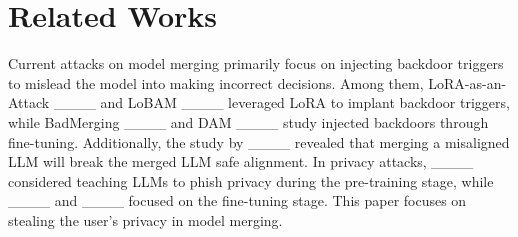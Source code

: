 \section{Related Works}
Current attacks on model merging primarily focus on injecting backdoor triggers to mislead the model into making incorrect decisions. Among them, LoRA-as-an-Attack ____ and LoBAM ____ leveraged LoRA to implant backdoor triggers, while BadMerging ____ and DAM ____ study injected backdoors through fine-tuning. Additionally, the study by ____ revealed that merging a misaligned LLM will break the merged LLM safe alignment. In privacy attacks,  ____ considered teaching LLMs to phish privacy during the pre-training stage, while ____ and ____ focused on the fine-tuning stage. This paper focuses on stealing the user’s privacy in model merging.